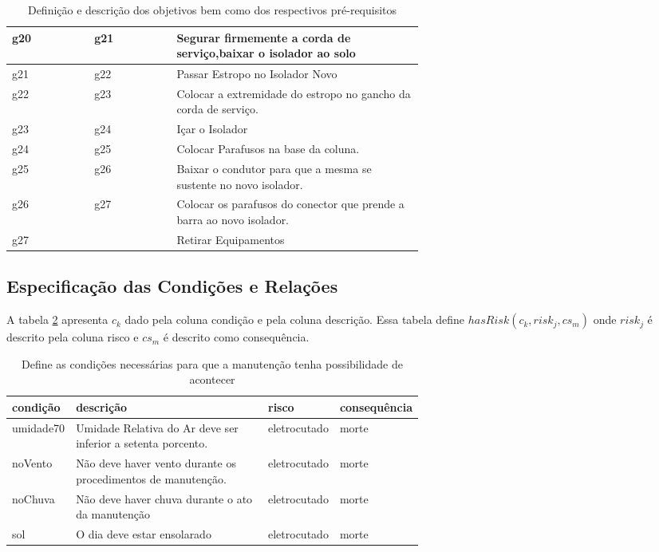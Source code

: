 \begin{table}[H]
\begin{tabular}{|l|l|p{0.6\linewidth}|}
g20 & g21 & Segurar firmemente a corda de serviço,baixar o isolador ao solo \\ \hline
g21 & g22 & Passar Estropo no Isolador Novo \\ \hline
g22 & g23 & Colocar a extremidade do estropo no gancho da corda de serviço. \\ \hline
g23 & g24 & Içar o Isolador \\ \hline
g24 & g25 & Colocar Parafusos na base da coluna. \\ \hline
g25 & g26 & Baixar o condutor para que a mesma se sustente no novo isolador. \\ \hline
g26 & g27 & Colocar os parafusos do conector que prende a barra ao novo isolador. \\ \hline
g27 &     & Retirar Equipamentos \\ \hline
\end{tabular}
\caption{Definição e descrição dos objetivos bem como dos respectivos pré-requisitos}
\label{g}
\end{table}

\subsection{Especificação das Condições e Relações}

A tabela \ref{condition} apresenta $c_k$ dado pela coluna condição e pela coluna descrição. Essa tabela define $hasRisk(c_k,risk_j,cs_m)$ onde $risk_j$ é descrito pela coluna risco e $cs_m$ é descrito como consequência. 

\begin{table}[H]
\centering
\begin{tabular}{|l|p{0.6\linewidth}|l|l|}
\hline
\textbf{condição} & \textbf{descrição} & \textbf{risco} & \textbf{consequência} \\ \hline
umidade70 & Umidade Relativa do Ar deve ser inferior a setenta porcento. & eletrocutado & morte \\ \hline
noVento & Não deve haver vento durante os procedimentos de manutenção. & eletrocutado & morte \\ \hline
noChuva & Não deve haver chuva durante o ato da manutenção & eletrocutado & morte \\ \hline
sol & O dia deve estar ensolarado & eletrocutado & morte \\ \hline
\end{tabular}
\caption{Define as condições necessárias para que a manutenção tenha possibilidade de acontecer}
\label{condition}
\end{table}


